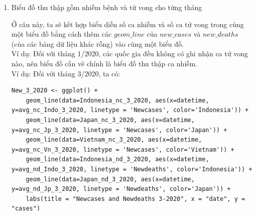 \documentclass[a4paper]{article}
\theoremstyle{definition}
\begin{document}
\begin{enumerate}[1)]
    \item Biểu đồ thu thập gồm nhiễm bệnh và tử vong cho từng tháng
    
	Ở câu này, ta sẽ kết hợp biểu diễn số ca nhiễm và số ca tử vong trong cùng một biểu đồ bằng cách thêm các $geom\_line$ của $new\_cases$ và $new\_deaths$ (của các bảng dữ liệu khác rỗng) vào cùng một biểu đồ.\\[8pt] 
	Ví dụ: Đối với tháng 1/2020, các quốc gia đều không có ghi nhận ca tử vong nào, nên biểu đồ cần vẽ chính là biểu đồ thu thập ca nhiễm.\\
	Ví dụ: Đối với tháng 3/2020, ta có:
	
	\begin{lstlisting}
New_3_2020 <- ggplot() +
	geom_line(data=Indonesia_nc_3_2020, aes(x=datetime, y=avg_nc_Indo_3_2020, linetype = 'Newcases', color='Indonesia')) +
	geom_line(data=Japan_nc_3_2020, aes(x=datetime, y=avg_nc_Jp_3_2020, linetype = 'Newcases', color='Japan')) +
	geom_line(data=Vietnam_nc_3_2020, aes(x=datetime, y=avg_nc_Vn_3_2020, linetype = 'Newcases', color='Vietnam')) +
	geom_line(data=Indonesia_nd_3_2020, aes(x=datetime, y=avg_nd_Indo_3_2020, linetype = 'Newdeaths', color='Indonesia')) +
	geom_line(data=Japan_nd_3_2020, aes(x=datetime, y=avg_nd_Jp_3_2020, linetype = 'Newdeaths', color='Japan')) +
	labs(title = "Newcases and Newdeaths 3-2020", x = "date", y = "cases")
	\end{lstlisting}
	

\end{enumerate}
\end{document}

